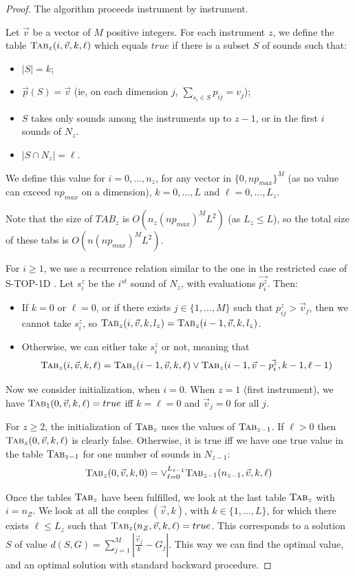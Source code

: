 \documentclass[a4paper]{book}
\newtheorem{proof}{\noindent{\bf Proof.} }
\newcommand{\statoned}{{\sc S-TOP-1D }}
\begin{document}
\begin{proof}
The algorithm proceeds instrument by instrument. 

Let $\vec{v}$ be a vector of $M$ positive integers. For each instrument $z$, we define the table $\text{\sc{Tab}}_z(i,\vec{v},k,\ell)$ which equals $true$ if there is a subset $S$ of sounds such that:
\begin{itemize}
    \item $|S|=k$;
    \item $\vec{p}(S)=\vec{v}$ (ie, on each dimension $j$, $\sum_{s_i\in S}p_{ij}=v_{j}$);
    \item $S$ takes only sounds among the instruments up to $z-1$, or in the first $i$ sounds of $N_z$.
    \item $|S\cap N_z|=\ell$. 
\end{itemize}

We define this value for $i=0,\dots,n_z$, for any vector in $\{0,np_{max}\}^M$ (as no value can exceed $np_{max}$ on a dimension), $k=0,\dots,L$ and $\ell=0,\dots,L_z$. 

Note that the size of $TAB_z$ is $O(n_z(np_{max})^ML^2)$ (as $L_z\leq L$), so the total size of these tabs is $O(n(np_{max})^ML^2)$.

For $i\geq 1$, we use a recurrence relation similar to the one in the restricted case of \statoned. 
Let $s^z_i$ be the $i^{st}$ sound of $N_z$, with evaluations $\vec{p^z_i}$. Then:
\begin{itemize}
    \item If $k=0$ or $\ell=0$, or if there exists $j\in \{1,\dots,M\}$ such that $p^z_{ij}>\vec{v}_{j}$, then we cannot take $s^z_i$, so $\text{\sc{Tab}}_z(i,\vec{v},k,l_z)=\text{\sc{Tab}}_z(i-1,\vec{v},k,l_z)$. 
    \item Otherwise, we can either take $s^z_i$ or not, meaning that $$\text{\sc{Tab}}_z(i,\vec{v},k,\ell)=\text{\sc{Tab}}_z(i-1,\vec{v},k,\ell)\vee\text{\sc{Tab}}_z(i-1,\vec{v}-\vec{p^z_i},k-1,\ell-1)$$
\end{itemize}
Now we consider initialization, when $i=0$. When $z=1$ (first instrument), we have $\text{\sc{Tab}}_1(0,\vec{v},k,\ell)=true$ iff $k=\ell=0$ and $\vec{v}_j=0$ for all $j$.

For $z\geq 2$, the initialization of $\text{\sc{Tab}}_z$ uses the values of $\text{\sc{Tab}}_{z-1}$. If $\ell>0$ then $\text{\sc{Tab}}_z(0,\vec{v},k,\ell)$ is clearly false. Otherwise, it is true iff we have one true value in the table $\text{\sc{Tab}}_{z-1}$ for one number of sounds in $N_{z-1}$: 
$$\text{\sc{Tab}}_z(0,\vec{v},k,0)=\vee_{\ell=0}^{L_{z-1}}\text{\sc{Tab}}_{z-1}(n_{z-1},\vec{v},k,\ell)$$

Once the tables $\text{\sc{Tab}}_z$ have been fulfilled, we look at the last table $\text{\sc{Tab}}_z$ with $i=n_Z$. We look at all the couples $(\vec{v},k)$, with $k\in \{1,\dots,L\}$, for which there exists $\ell\le L_z$ such that $\text{\sc{Tab}}_z(n_Z,\vec{v},k,\ell)=true$. This corresponds to a solution $S$ of value $d(S,G)=\sum_{j=1}^M \left| \frac{\vec{v}_j}{k}-G_j \right|$. This way we can find the optimal value, and an optimal solution with standard backward procedure.\end{proof}
\end{document}
